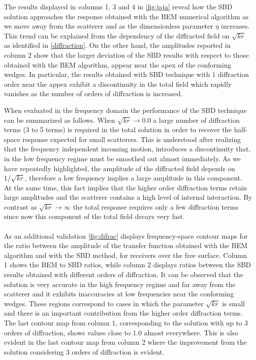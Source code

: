 \documentclass[11pt,letterpaper]{article}
\begin{document}
The results displayed in columns 1, 3 and 4 in \cref{fig:jaja} reveal how the SBD solution approaches the response obtained with the BEM numerical algorithm as we move away from the scatterer and as the dimensionless parameter $\eta$ increases. This trend can be explained from the dependency of the diffracted field on $\sqrt{k r}$ as identified in \cref{diffraction}. On the other hand, the amplitudes reported in column 2 show that the larger deviation of the SBD results with respect to those obtained with the BEM algorithm, appear near the apex of the conforming wedges. In particular, the results obtained with SBD technique with $1$ diffraction order near the appex exhibit a discontinuity in the total field which rapidly vanishes as the number of orders of diffraction is increased.

When evaluated in the frequency domain the performance of the SBD technique can be summarized as follows. When $\sqrt{k r} \rightarrow 0.0$ a large number of diffraction terms (3 to 5 terms) is required in the total solution in order to recover the half-space response expected for small scatterers. This is understood after realizing that the frequency independent incoming motion, introduces a discontinuity that, in the low frequency regime must be smoothed out almost immediately. As we have repeatedly highlighted, the amplitude of the diffracted field depends on $1/\sqrt{k r}$, therefore a low frequency implies a large amplitude in this component. At the same time, this fact implies that the higher order diffraction terms retain large amplitudes and the scatterer contains a high level of internal interaction. By contrast as $\sqrt{k r} \rightarrow \infty$ the total response requires only a few diffraction terms since now this component of the total field decays very fast.\\\\

As an additional validation \cref{fig:difrac} displays frequency-space contour maps for the ratio between the amplitude of the transfer function obtained with the BEM algorithm and with the SBD method, for receivers over the free surface. Column 1 shows the BEM to SBD ratios, while column 2 displays ratios between the SBD results obtained with different orders of diffraction. It can be observed that the solution is very accurate in the high frequency regime and far away from the scatterer and it exhibits inaccuracies at low frequencies near the conforming wedges. These regions correspond to cases in which the parameter $\sqrt{k r}$ is small and there is an important contribution from the higher order diffraction terms. The last contour map from column 1, corresponding to the solution with up to $3$ orders of diffraction, shows values close to $1.0$ almost everywhere. This is also evident in the last contour map from column 2 where the improvement from the solution considering $3$ orders of diffraction is evident.
%
\end{document}
